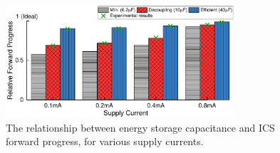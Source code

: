 

\begin{figure}[!t]
    \centering
    \includegraphics[width=3.33in]{ch3_sizingeffect/figures/ImprValidColorFig1}
    \caption{The relationship between energy storage capacitance and ICS forward progress, for various supply currents. }
    \label{fig:imprvalid1}
\end{figure}


